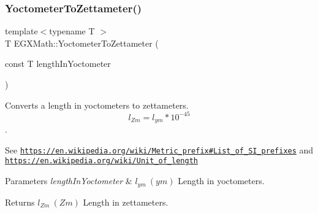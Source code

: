 \subsubsection{\texorpdfstring{Yoctometer\+To\+Zettameter()}{YoctometerToZettameter()}}
{\footnotesize\ttfamily template$<$typename T $>$ \\
T E\+G\+X\+Math\+::\+Yoctometer\+To\+Zettameter (\begin{DoxyParamCaption}\item[{const T}]{length\+In\+Yoctometer }\end{DoxyParamCaption})}



Converts a length in yoctometers to zettameters. \[ l_{Zm}=l_{ym} * 10^{-45} \]. 

See \href{https://en.wikipedia.org/wiki/Metric_prefix#List_of_SI_prefixes}{\tt https\+://en.\+wikipedia.\+org/wiki/\+Metric\+\_\+prefix\#\+List\+\_\+of\+\_\+\+S\+I\+\_\+prefixes} and \href{https://en.wikipedia.org/wiki/Unit_of_length}{\tt https\+://en.\+wikipedia.\+org/wiki/\+Unit\+\_\+of\+\_\+length} 
\begin{DoxyParams}{Parameters}
{\em length\+In\+Yoctometer} & $ l_{ym}\ (ym)$ Length in yoctometers. \\
\hline
\end{DoxyParams}
\begin{DoxyReturn}{Returns}
$ l_{Zm}\ (Zm)$ Length in zettameters. 
\end{DoxyReturn}
